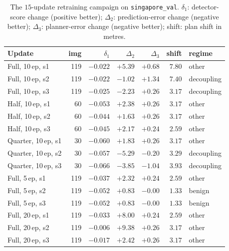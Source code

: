 \documentclass[conference]{IEEEtran}
\begin{document}
\begin{table}[htbp]
\caption{The $15$-update retraining campaign on \texttt{singapore\_val}.
$\delta_1$: detector-score change (positive better); $\Delta_2$:
prediction-error change (negative better); $\Delta_3$: planner-error change
(negative better); shift: plan shift in metres.}
\label{tab:campaign}
\centering
\renewcommand{\arraystretch}{1.15}
\setlength{\tabcolsep}{3.5pt}
\footnotesize
\begin{tabular}{@{}lrrrrrl@{}}
\toprule
\textbf{Update} & \textbf{img} & \textbf{$\delta_1$} & \textbf{$\Delta_2$} & \textbf{$\Delta_3$} & \textbf{shift} & \textbf{regime} \\
\midrule
Full, 10\,ep, s1      & 119 & $-0.022$ & $+5.39$ & $+0.68$ & $7.80$ & other \\
Full, 10\,ep, s2      & 119 & $-0.022$ & $-1.02$ & $+1.34$ & $7.40$ & decoupling \\
Full, 10\,ep, s3      & 119 & $-0.025$ & $-2.23$ & $+0.26$ & $3.17$ & decoupling \\
Half, 10\,ep, s1      &  60 & $-0.053$ & $+2.38$ & $+0.26$ & $3.17$ & other \\
Half, 10\,ep, s2      &  60 & $-0.044$ & $+1.63$ & $+0.26$ & $3.17$ & other \\
Half, 10\,ep, s3      &  60 & $-0.045$ & $+2.17$ & $+0.24$ & $2.59$ & other \\
Quarter, 10\,ep, s1   &  30 & $-0.060$ & $+1.83$ & $+0.26$ & $3.17$ & other \\
Quarter, 10\,ep, s2   &  30 & $-0.057$ & $-5.29$ & $-0.20$ & $3.29$ & decoupling \\
Quarter, 10\,ep, s3   &  30 & $-0.066$ & $-3.85$ & $-1.04$ & $3.93$ & decoupling \\
Full, 5\,ep, s1       & 119 & $-0.037$ & $+2.32$ & $+0.24$ & $2.59$ & other \\
Full, 5\,ep, s2       & 119 & $-0.052$ & $+0.83$ & $-0.00$ & $1.33$ & benign \\
Full, 5\,ep, s3       & 119 & $-0.052$ & $+0.83$ & $-0.00$ & $1.33$ & benign \\
Full, 20\,ep, s1      & 119 & $-0.033$ & $+8.00$ & $+0.24$ & $2.59$ & other \\
Full, 20\,ep, s2      & 119 & $-0.006$ & $+9.38$ & $+0.26$ & $3.17$ & other \\
Full, 20\,ep, s3      & 119 & $-0.017$ & $+2.42$ & $+0.26$ & $3.17$ & other \\
\bottomrule
\end{tabular}
\end{table}
\end{document}
